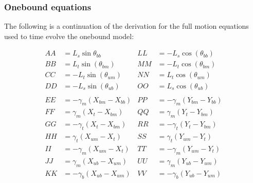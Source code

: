 \documentclass[10pt]{article} %
\begin{document}
\subsubsection{Onebound equations}
\label{onebound-motion-equations}
The following is a continuation of the derivation for the full motion equations used to time evolve the onebound model:

\begin{align*}
AA &= L_s\sin\theta_{bb}      &   LL &= -L_s\cos(\theta_{bb})\\
BB &= L_t\sin(\theta_{bm})    &	 MM &= -L_t\cos(\theta_{bm})\\
CC &= -L_t\sin(\theta_{um})   &	 NN &= L_t\cos(\theta_{um})\\
DD &= -L_s\sin(\theta_{ub})   &	 OO &= L_s\cos(\theta_{ub})\\
\\
EE &= -\gamma_m (X_{bm} - X_{bb})       &  PP &= -\gamma_m (Y_{bm} - Y_{bb})\\
FF &= \gamma_m (X_{t } - X_{bm})        &	 QQ &= \gamma_m (Y_{t } - Y_{bm})\\ 
GG &= -\gamma_t (X_{t } - X_{bm})       &	 RR &= -\gamma_t (Y_{t } - Y_{bm})\\
HH &= \gamma_t (X_{um} - X_{t })        &	 SS &= \gamma_t (Y_{um} - Y_{t })\\ 
II &= -\gamma_m (X_{um} - X_{t })       &	 TT &= -\gamma_m (Y_{um} - Y_{t })\\
JJ &= \gamma_m (X_{ub} - X_{um})        &	 UU &= \gamma_m (Y_{ub} - Y_{um})\\ 
KK &= -\gamma_b (X_{ub} - X_{um})       &	 VV &= -\gamma_b (Y_{ub} - Y_{um})\\
\end{align*}%
%
\end{document}
